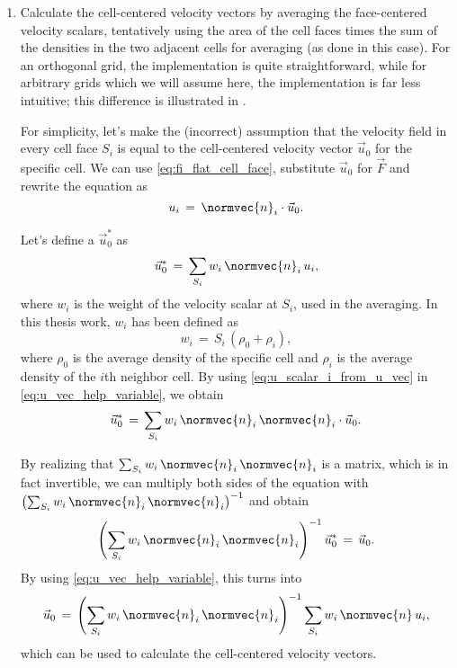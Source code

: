 \begin{enumerate}
    \item Calculate the cell-centered velocity vectors by averaging the face-centered velocity scalars, tentatively using the area of the cell faces times the sum of the densities in the two adjacent cells for averaging (as done in this case). For an orthogonal grid, the implementation is quite straightforward, while for arbitrary grids which we will assume here, the implementation is far less intuitive; this difference is illustrated in .
    
    For simplicity, let's make the (incorrect) assumption that the velocity field in every cell face $S_i$ is equal to the cell-centered velocity vector $\vec{u}_0$ for the specific cell. We can use \eqref{eq:fi_flat_cell_face}, substitute $\vec{u}_0$ for $\vec{F}$ and rewrite the equation as
    \begin{equation} \label{eq:u_scalar_i_from_u_vec}
    u_i \,=\, \normvec{n}_i\cdot\vec{u}_0.
    \end{equation}
    
    Let's define a  $\vec{u}_0^*$ as
    \begin{equation} \label{eq:u_vec_help_variable}
    \vec{u}_0^* \,=\, \sum_{S_i}w_i\,\normvec{n}_i\,u_i,
    \end{equation}
    where $w_i$ is the weight of the velocity scalar at $S_i$, used in the averaging. In this thesis work, $w_i$ has been defined as
    \begin{equation}
    w_i \,=\, S_i\,(\rho_0 + \rho_i),
    \end{equation}
    where $\rho_0$ is the average density of the specific cell and $\rho_i$ is the average density of the $i$th neighbor cell. By using \eqref{eq:u_scalar_i_from_u_vec} in \eqref{eq:u_vec_help_variable}, we obtain
    \begin{equation}
    \vec{u}_0^* \,=\, \sum_{S_i}w_i\,\normvec{n}_i\,\normvec{n}_i\cdot\vec{u}_0.
    \end{equation}
    
    By realizing that $\sum_{S_i}w_i\,\normvec{n}_i\,\normvec{n}_i$ is a matrix, which is in fact invertible, we can multiply both sides of the equation with $\left(\sum_{S_i}w_i\,\normvec{n}_i\,\normvec{n}_i\right)^{-1}$ and obtain
    \begin{equation}
    \left(\sum_{S_i}w_i\,\normvec{n}_i\,\normvec{n}_i\right)^{-1}\vec{u}_0^* \,=\, \vec{u}_0.
    \end{equation}
    By using \eqref{eq:u_vec_help_variable}, this turns into
    \begin{equation}
    \vec{u}_0 \,=\, \left(\sum_{S_i}w_i\,\normvec{n}_i\,\normvec{n}_i\right)^{-1}\sum_{S_i}w_i\,\normvec{n}\,u_i,
    \end{equation}
    which can be used to calculate the cell-centered velocity vectors.
    

\end{enumerate}
